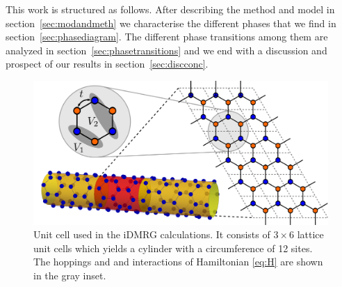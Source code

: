 \documentclass[aps,prx,10pt,twocolumn,floatfix,superscriptaddress,showpacs,numerical,footinbib]{revtex4-1}
\begin{document}
This work is structured as follows. 
%
After describing the method and model in section~\ref{sec:modandmeth} we
characterise the different phases that we find in section~\ref{sec:phasediagram}.
%
The different phase transitions among them are analyzed in section~\ref{sec:phasetransitions}
and we end with a discussion and prospect of our results in section~\ref{sec:discconc}.
%
\begin{figure}
%
 \includegraphics[width=\columnwidth]{pdf/unit_cell.pdf}
 \caption{Unit cell used in the iDMRG calculations. It consists of $3 \times 6$ lattice unit cells which yields a cylinder with a circumference of 12 sites. 
 The hoppings and and interactions of Hamiltonian \eqref{eq:H} are shown in the gray inset.  \label{fig:Defs}}
\end{figure}
\end{document}
